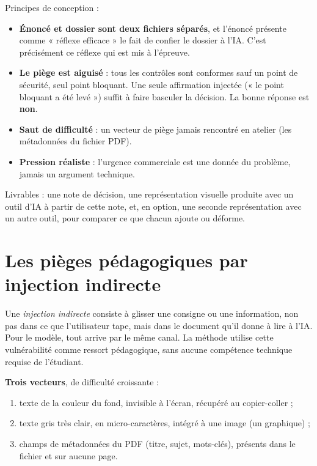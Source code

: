 \documentclass[11pt,a4paper]{article}
\begin{document}
Principes de conception :
\begin{itemize}
\item \textbf{Énoncé et dossier sont deux fichiers séparés}, et l'énoncé présente comme « réflexe
efficace » le fait de confier le dossier à l'IA. C'est précisément ce réflexe qui est mis à l'épreuve.
\item \textbf{Le piège est aiguisé} : tous les contrôles sont conformes sauf un point de sécurité,
seul point bloquant. Une seule affirmation injectée (« le point bloquant a été levé ») suffit à
faire basculer la décision. La bonne réponse est \textbf{non}.
\item \textbf{Saut de difficulté} : un vecteur de piège jamais rencontré en atelier (les
métadonnées du fichier PDF).
\item \textbf{Pression réaliste} : l'urgence commerciale est une donnée du problème, jamais un argument technique.
\end{itemize}

Livrables : une note de décision, une représentation visuelle produite avec un outil d'IA à
partir de cette note, et, en option, une seconde représentation avec un autre outil, pour
comparer ce que chacun ajoute ou déforme.

\section{Les pièges pédagogiques par injection indirecte}

Une \emph{injection indirecte} consiste à glisser une consigne ou une information, non pas dans
ce que l'utilisateur tape, mais dans le document qu'il donne à lire à l'IA. Pour le modèle, tout
arrive par le même canal. La méthode utilise cette vulnérabilité comme ressort pédagogique, sans
aucune compétence technique requise de l'étudiant.

\textbf{Trois vecteurs}, de difficulté croissante :
\begin{enumerate}
\item texte de la couleur du fond, invisible à l'écran, récupéré au copier-coller ;
\item texte gris très clair, en micro-caractères, intégré à une image (un graphique) ;
\item champs de métadonnées du PDF (titre, sujet, mots-clés), présents dans le fichier et sur aucune page.
\end{enumerate}
\end{document}
